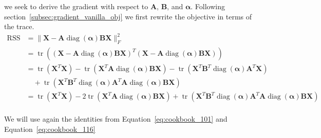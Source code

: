 \documentclass[oneside]{article}
\begin{document}
we seek to derive the gradient with respect to $\mathbf{A}$, $\mathbf{B}$, and $\boldsymbol{\alpha}$. Following section~\ref{subsec:gradient_vanilla_obj} we first rewrite the objective in terms of the trace.
\begin{equation}
    \label{eq:relaxed_objective_standard_trace}
    \begin{aligned}
        \operatorname{RSS} &= \| \mathbf{{X}} - \mathbf{{A}} \operatorname{diag}(\boldsymbol{\alpha}) \mathbf{B} \mathbf{X} \|_F^2 \\
        &= \operatorname{tr} \left( \left( \mathbf{{X}} - \mathbf{{A}} \operatorname{diag}(\boldsymbol{\alpha}) \mathbf{B} \mathbf{X} \right)^T
            \left( \mathbf{{X}} - \mathbf{{A}} \operatorname{diag}(\boldsymbol{\alpha}) \mathbf{B} \mathbf{X} \right) \right) \\
        &= \operatorname{tr} \left( \mathbf{{X}}^T \mathbf{{X}} \right)
            - \operatorname{tr} \left( \mathbf{{X}}^T \mathbf{{A}} \operatorname{diag}(\boldsymbol{\alpha}) \mathbf{B} \mathbf{X} \right)
            - \operatorname{tr} \left( \mathbf{X}^T \mathbf{B}^T \operatorname{diag}(\boldsymbol{\alpha}) \mathbf{{A}}^T \mathbf{{X}} \right) \\
        &\quad + \operatorname{tr} \left( \mathbf{X}^T \mathbf{B}^T \operatorname{diag}(\boldsymbol{\alpha}) \mathbf{{A}}^T \mathbf{{A}} \operatorname{diag}(\boldsymbol{\alpha}) \mathbf{B} \mathbf{X} \right) \\
        &= \operatorname{tr}\left( \mathbf{X}^T \mathbf{X} \right)
            - 2 \operatorname{tr} \left( \mathbf{{X}}^T \mathbf{{A}} \operatorname{diag}(\boldsymbol{\alpha}) \mathbf{B} \mathbf{X} \right)
            + \operatorname{tr} \left( \mathbf{X}^T \mathbf{B}^T \operatorname{diag}(\boldsymbol{\alpha}) \mathbf{{A}}^T \mathbf{{A}} \operatorname{diag}(\boldsymbol{\alpha}) \mathbf{B} \mathbf{X} \right) \\
    \end{aligned}
\end{equation}

We will use again the identities from Equation~\ref{eq:cookbook_101} and Equation~\ref{eq:cookbook_116}
\end{document}
